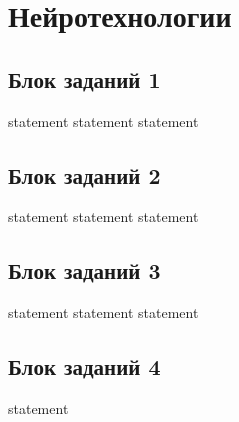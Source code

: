 \chapter{Нейротехнологии}

\section{Блок заданий 1}

{statement}
{statement}
{statement}

\section{Блок заданий 2}

{statement}
{statement}
{statement}

\section{Блок заданий 3}

{statement}
{statement}
{statement}

\section{Блок заданий 4}

{statement}